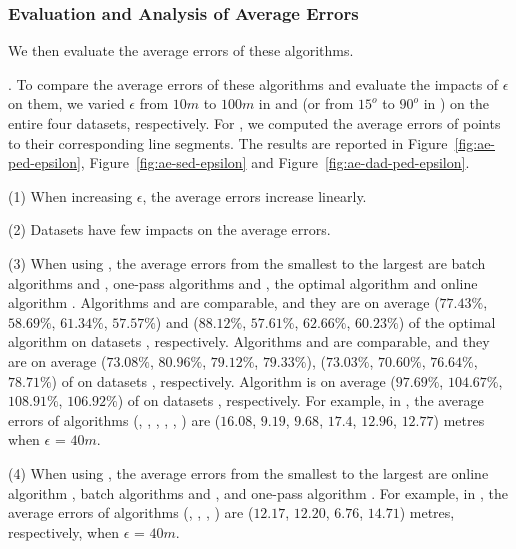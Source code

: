 \subsubsection{Evaluation and Analysis of Average Errors}
We then evaluate the average errors of these algorithms.





.
To compare the average errors of these algorithms and evaluate the impacts of $\epsilon$ on them, we varied $\epsilon$ from $10m$ to $100m$ in \ped and \sed (or from $15^o$ to $90^o$ in \dad) on the entire four datasets, respectively.
For \dad, we computed the average \ped errors of points to their corresponding line segments.
The results are reported in Figure~\ref{fig:ae-ped-epsilon}, Figure~\ref{fig:ae-sed-epsilon} and Figure~\ref{fig:ae-dad-ped-epsilon}.


\sstab (1) When increasing $\epsilon$, the average errors increase linearly.

\sstab (2) Datasets have few impacts on the average errors.

\sstab (3) When using \ped, the average errors from the smallest
to the largest are batch algorithms \tpa and \dpa, one-pass
algorithms \siped and \operb, the optimal algorithm \opt and online algorithm \bqsa.
Algorithms \tpa and
\dpa are comparable, and they are on average ($77.43\%$, $58.69\%$, $61.34\%$,
$57.57\%$) and ($88.12\%$, $57.61\%$, $62.66\%$, $60.23\%$) of the optimal algorithm \opt on datasets \dSets, respectively.
Algorithms \siped and \operb are comparable, and they are on average
($73.08\%$, $80.96\%$, $79.12\%$, $79.33\%$), ($73.03\%$, $70.60\%$, $76.64\%$, $78.71\%$) of \opt on datasets \dSets, respectively.
Algorithm \bqsa is on average ($97.69\%$, $104.67\%$, $108.91\%$, $106.92\%$) of \opt on datasets \dSets, respectively.
%
For example, in \mopsi, the average errors of algorithms
(\opt, \tpa, \dpa, \bqsa, \siped, \operb ) are ($16.08$, $9.19$, $9.68$, $17.4$, $12.96$, $12.77$)  metres when $\epsilon$ = $40m$.

\sstab (4) When using \sed, the average errors from the smallest
to the largest are online algorithm \squishe, batch algorithms \tpa and \dpa,
and one-pass algorithm \cised.
For example, in \mopsi, the average errors of algorithms
(\tpa, \dpa, \squishe, \cised) are ($12.17$, $12.20$, $6.76$, $14.71$) metres, respectively, when $\epsilon$ = $40m$.


